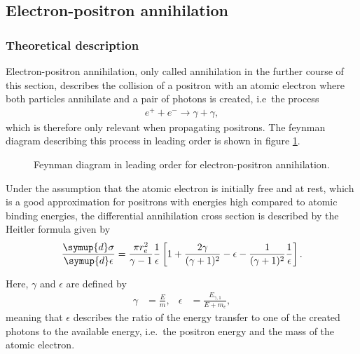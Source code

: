\subsection{Electron-positron annihilation}
\label{sec:annihilation}
\subsubsection{Theoretical description}

Electron-positron annihilation, only called annihilation in the further course of this section, describes the collision of a positron with an atomic electron where both particles annihilate and a pair of photons is created, i.e\ the process
%
\begin{align*}
	e^+ + e^- \rightarrow \gamma + \gamma,
\end{align*}
which is therefore only relevant when propagating positrons.
%
The feynman diagram describing this process in leading order is shown in figure \ref{fig:feynman_annihilation}.
%
\begin{figure}
    \centering
    
    \caption{Feynman diagram in leading order for electron-positron annihilation.}
    \label{fig:feynman_annihilation}
\end{figure}

Under the assumption that the atomic electron is initially free and at rest, which is a good approximation for positrons with energies high compared to atomic binding energies, the differential annihilation cross section is described by the Heitler formula \cite{heitler1954quantum} given by \cite{Hirayama:2005zm}
%
\begin{equation}
	\label{eqn:heitler_annihilation}
	\frac{\symup{d}\sigma}{\symup{d}\epsilon} = \frac{\pi r_e^2}{\gamma - 1} \frac{1}{\epsilon} \left[ 1 + \frac{2 \gamma}{(\gamma + 1)^2} - \epsilon - \frac{1}{(\gamma + 1)^2} \frac{1}{\epsilon} \right].
\end{equation}
%

Here, $\gamma$ and $\epsilon$ are defined by
%
\begin{align*}
	\gamma &= \frac{E}{m}, & \epsilon &= \frac{E_{\gamma, 1}}{E + m_e},
\end{align*}
%
meaning that $\epsilon$ describes the ratio of the energy transfer to one of the created photons to the available energy, i.e.\ the positron energy and the mass of the atomic electron.

